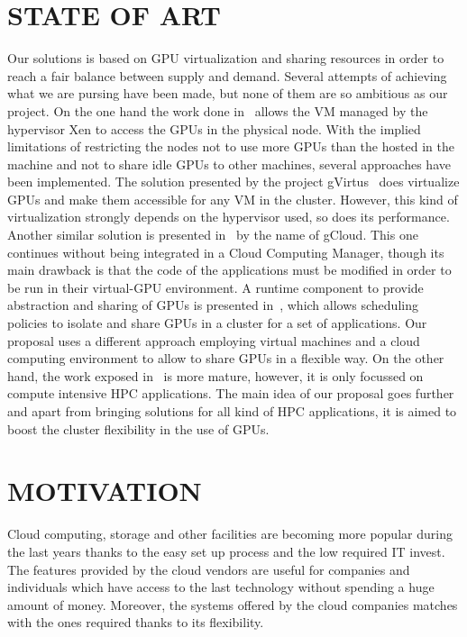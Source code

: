 \documentclass[a4paper,twoside]{article}
\begin{document}
\section{\uppercase{State of Art}}
\label{sec:state}
Our solutions is based on GPU virtualization and sharing resources in order
to reach a fair balance between supply and demand.
Several attempts of achieving what we are pursing have been
made, but none of them are so ambitious as our project. On
the one hand the work done in~\cite{younge2013enabling} allows the VM managed
by the hypervisor Xen to access the GPUs in the physical
node. With the implied limitations of restricting the nodes not
to use more GPUs than the hosted in the machine and not
to share idle GPUs to other machines, several approaches have been implemented.
The solution presented by the project gVirtus~\cite{giunta2010gpgpu} does virtualize GPUs and make
them accessible for any VM in the cluster. However, this kind
of virtualization strongly depends on the hypervisor used, so
does its performance. Another similar solution is presented in~\cite{diab2013dynamic} by the name of gCloud. 
This one continues without being integrated in a Cloud Computing Manager, though its main
drawback is that the code of the applications must be modified
in order to be run in their virtual-GPU environment. A runtime component to provide abstraction
and sharing of GPUs is presented in~\cite{becchi2012virtual}, which allows scheduling policies 
to isolate and share GPUs in a cluster for a set of applications. Our proposal uses a different 
approach employing virtual machines and a cloud computing environment to allow to share GPUs in a flexible way.
On the other hand, the work exposed in~\cite{jungpgpu} is more mature, however,
it is only focussed on compute intensive HPC applications. 
The main idea of our proposal goes further and apart from
bringing solutions for all kind of HPC applications, it is aimed
to boost the cluster flexibility in the use of GPUs.

\section{\uppercase{Motivation}}
\label{sec:motivation}

Cloud computing, storage and other facilities are becoming 
more popular during the last years thanks to the easy set up 
process and the low required IT invest. The features provided 
by the cloud vendors are useful for companies and individuals 
which have access to the last technology without spending a 
huge amount of money. Moreover, the systems offered by the cloud 
companies matches with the ones required thanks to its flexibility.
\end{document}
